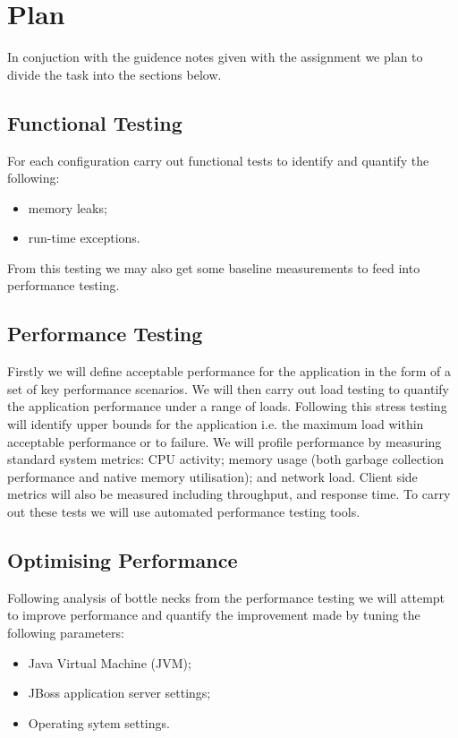 \chapter{Plan}
In conjuction with the guidence notes given with the assignment we plan to divide the task into the sections below.

\section{Functional Testing}
For each configuration carry out functional tests to identify and quantify the following:
\begin{itemize}
\item memory leaks;
\item run-time exceptions.
\end{itemize}
From this testing we may also get some baseline measurements to feed into performance testing.

\section{Performance Testing}
Firstly we will define acceptable performance for the application in the form of a set of key performance scenarios. We will then carry out load testing to quantify the application performance under a range of loads. Following this stress testing will identify upper bounds for the application i.e. the maximum load within acceptable performance or to failure. We will profile performance by measuring standard system metrics: CPU activity; memory usage (both garbage collection performance and native memory utilisation); and network load. Client side metrics will also be measured including throughput, and response time. To carry out these tests we will use automated performance testing tools.

\section{Optimising Performance}
Following analysis of bottle necks from the performance testing we will attempt to improve performance and quantify the improvement made by tuning the following parameters:
\begin{itemize}
 \item Java Virtual Machine (JVM);
 \item JBoss application server settings;
 \item Operating sytem settings.
\end{itemize}

